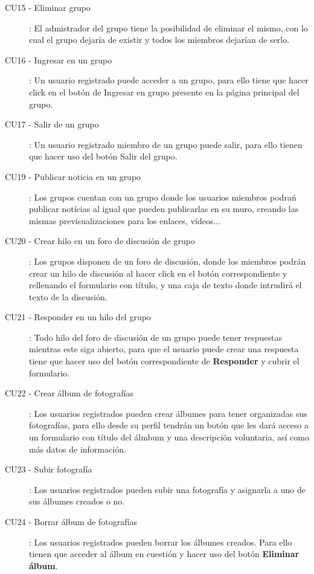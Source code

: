 \documentclass[12pt, a4paper, titlepage]{article}
\begin{document}
\begin{description}
	\item [CU15 - Eliminar grupo]: El admistrador del grupo tiene la posibilidad de eliminar el mismo, con lo cual el grupo dejaría de existir y todos los miembros dejarían de serlo.
	
	\item [CU16 - Ingresar en un grupo]: Un usuario registrado puede acceder a un grupo, para ello tiene que hacer click en el botón de Ingresar en grupo presente en la página principal del grupo.
	
	\item [CU17 - Salir de un grupo]: Un usuario registrado miembro de un grupo puede salir, para ello tienen que hacer uso del botón Salir del grupo.
	
	\item [CU19 - Publicar noticia en un grupo]: Los grupos cuentan con un grupo donde los usuarios miembros podrań publicar notícias al igual que pueden publicarlas en su muro, creando las mismas previsualizaciones para los enlaces, vídeos...
	
	\item [CU20 - Crear hilo en un foro de discusión de grupo]: Los grupos disponen de un foro de discusión, donde los miembros podrán crear un hilo de discusión al hacer click en el botón correspondiente y rellenando el formulario con título, y una caja de texto donde intrudirá el texto de la discusión.
	
	\item [CU21 - Responder en un hilo del grupo]: Todo hilo del foro de discusión de un grupo puede tener respuestas mientras este siga abierto, para que el usuario puede crear una respuesta tiene que hacer uso del botón correspondiente de \textbf{Responder} y cubrir el formulario.
	
	\item [CU22 - Crear álbum de fotografías]: Los usuarios registrados pueden crear álbumes para tener organizadas sus fotografías, para ello desde su perfil tendrán un botón que les dará acceso a un formulario con título del álmbum y una descripción voluntaria, así como más datos de información.
	
	\item [CU23 - Subir fotografía]:  Los usuarios registrados pueden subir una fotografía y asignarla a uno de sus álbumes creados o no. 
	
	\item [CU24 - Borrar álbum de fotografías]: Los usuarios registrados pueden borrar los álbumes creados. Para ello tienen que acceder al álbum en cuestión y hacer uso del botón \textbf{Eliminar álbum}.
	

\end{description}
\end{document}
